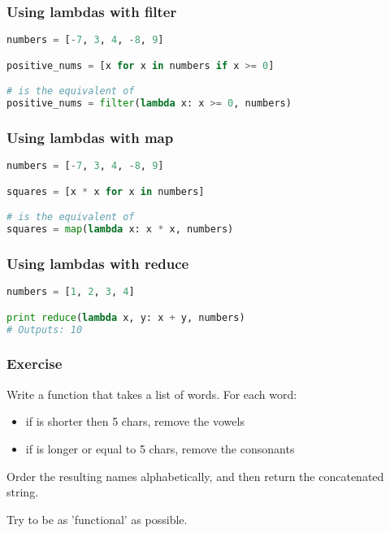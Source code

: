 \documentclass{beamer}
\begin{document}
\begin{frame}[fragile]
\frametitle{Using lambdas with filter}
\begin{lstlisting}[language=python]
numbers = [-7, 3, 4, -8, 9]

positive_nums = [x for x in numbers if x >= 0]

# is the equivalent of
positive_nums = filter(lambda x: x >= 0, numbers)
\end{lstlisting}
\end{frame}

\begin{frame}[fragile]
\frametitle{Using lambdas with map}
\begin{lstlisting}[language=python]
numbers = [-7, 3, 4, -8, 9]

squares = [x * x for x in numbers]

# is the equivalent of
squares = map(lambda x: x * x, numbers)

\end{lstlisting}
\end{frame}

\begin{frame}[fragile]
\frametitle{Using lambdas with reduce}
\begin{lstlisting}[language=python]
numbers = [1, 2, 3, 4]

print reduce(lambda x, y: x + y, numbers)
# Outputs: 10

\end{lstlisting}
\end{frame}


\begin{frame}[fragile]
\frametitle{Exercise}

Write a function that takes a list of words. For each word:
\begin{itemize}
   \item if is shorter then 5 chars, remove the vowels
   \item if is longer or equal to 5 chars, remove the consonants
\end{itemize}

Order the resulting names alphabetically, and then return the concatenated string.

\vspace{10 mm}
Try to be as 'functional' as possible.

\end{frame}
\end{document}
